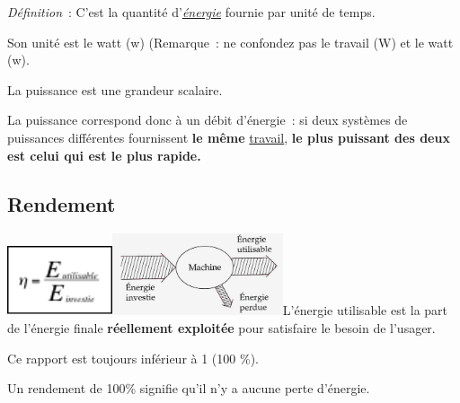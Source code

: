 \emph{Définition}~: C'est la quantité
d'\href{https://fr.wikipedia.org/wiki/\%C3\%89nergie_(physique)}{\emph{\emph{énergie}}}
fournie par unité de temps.

Son unité est le watt (\si{w}) (Remarque~: ne confondez pas le travail (W) et
le watt (\si{w}).

La puissance est une grandeur scalaire.

La puissance correspond donc à un débit d'énergie~: si deux systèmes de
puissances différentes fournissent \textbf{le même
}\href{https://fr.wikipedia.org/wiki/Travail_d\%27une_force}{travail},
\textbf{le plus puissant des deux est celui qui est le plus rapide.}




\subsection{Rendement }

\includegraphics[width=3.108cm,height=2.073cm]{Pictures/10000001000000500000003510F712318EAE4AA8.png}\includegraphics[width=5.011cm,height=2.441cm]{Pictures/100000010000046C00000226E09CB53258956B76.png}L'énergie
utilisable est la part de l'énergie finale \textbf{réellement exploitée}
pour satisfaire le besoin de l'usager.

Ce rapport est toujours inférieur à 1 (100 \%).

Un rendement de 100\% signifie qu'il n'y a aucune perte d'énergie.

